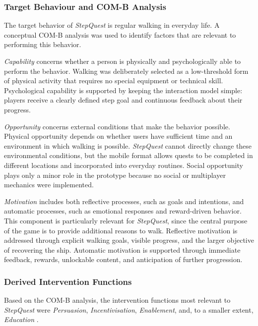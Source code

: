 \subsubsection{Target Behaviour and COM-B Analysis}

The target behavior of \textit{StepQuest} is regular walking in everyday life. A conceptual COM-B analysis was used to identify factors that are relevant to performing this behavior.

\textit{Capability} concerns whether a person is physically and psychologically able to perform the behavior. Walking was deliberately selected as a low-threshold form of physical activity that requires no special equipment or technical skill. Psychological capability is supported by keeping the interaction model simple: players receive a clearly defined step goal and continuous feedback about their progress.

\textit{Opportunity} concerns external conditions that make the behavior possible. Physical opportunity depends on whether users have sufficient time and an environment in which walking is possible. \textit{StepQuest} cannot directly change these environmental conditions, but the mobile format allows quests to be completed in different locations and incorporated into everyday routines. Social opportunity plays only a minor role in the prototype because no social or multiplayer mechanics were implemented.

\textit{Motivation} includes both reflective processes, such as goals and intentions, and automatic processes, such as emotional responses and reward-driven behavior. This component is particularly relevant for \textit{StepQuest}, since the central purpose of the game is to provide additional reasons to walk. Reflective motivation is addressed through explicit walking goals, visible progress, and the larger objective of recovering the ship. Automatic motivation is supported through immediate feedback, rewards, unlockable content, and anticipation of further progression.

\subsubsection{Derived Intervention Functions}

Based on the COM-B analysis, the intervention functions most relevant to \textit{StepQuest} were \textit{Persuasion}, \textit{Incentivisation}, \textit{Enablement}, and, to a smaller extent, \textit{Education} \cite{bcw2011}.

